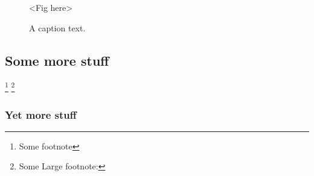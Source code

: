 \documentclass[]{ufsc-thesis-rn46-2019}
\begin{document}
\begin{figure}[tb]
  \centering
  \caption{\footnotesize A caption text.}
  \label{fig:f}

  <Fig here>
\end{figure}


\subsection{Some more stuff}
\label{sec:more}

\lipsum[1] \footnote{Some footnote}
\footnote{Some Large footnote: \lipsum[4]}

\subsubsection{Yet more stuff}
\label{sec:yet-more}

\lipsum[1]

\label{sec:yet-another}

\lipsum[1]


\postextual

\end{document}
